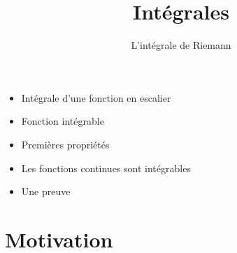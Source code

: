 










\title{{\bf Intégrales}}
\subtitle{L'intégrale de Riemann}

\begin{frame}
  
  \debutmontitre

  \pause

{\footnotesize
\hfill
{}
\begin{minipage}{0.6\textwidth}
  \begin{itemize}
    \item<3-> Intégrale d'une fonction en escalier
    \item<4-> Fonction intégrable
    \item<5-> Premières propriétés
    \item<6-> Les fonctions continues sont intégrables
    \item<7-> Une preuve
  \end{itemize}
\end{minipage}
}

\end{frame}

\setcounter{framenumber}{0}




\section*{Motivation}



